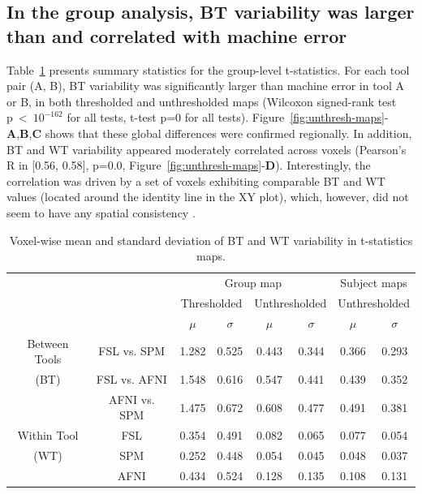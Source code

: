 \documentclass[11pt,onecolumn]{article}
\begin{document}
\subsection{In the group analysis, BT variability was larger than and correlated with machine error}

Table~\ref{table:pipeline-stats} presents summary statistics for the
group-level t-statistics. For each tool pair (A, B), BT variability was
significantly larger than machine error in tool A or B, in both thresholded
and unthresholded maps (Wilcoxon signed-rank test p~\textless~$10^{-162}$
for all tests, t-test p=0 for all tests).
Figure~\ref{fig:unthresh-maps}-\textbf{A},\textbf{B},\textbf{C} shows that
these global differences were confirmed regionally. 
In addition, BT and WT variability appeared moderately correlated across voxels (Pearson's R
in [0.56, 0.58], p=0.0, Figure~\ref{fig:unthresh-maps}-\textbf{D}). Interestingly, the correlation 
was driven by a set of voxels exhibiting comparable BT and
WT values (located around the identity line in the XY plot), which, however, did not seem to have 
any spatial consistency .


\setlength{\tabcolsep}{5pt}
\begin{table}[h]
    \centering
    \begin{tabular}{cccccc|cc}
        \toprule
        && \multicolumn{4}{c|}{Group map} & \multicolumn{2}{c}{Subject maps}\\
        \multirow{2}{*}{}& {} & \multicolumn{2}{c}{Thresholded} & \multicolumn{2}{c|}{Unthresholded} & \multicolumn{2}{c}{Unthresholded} \\
        {} & {} & $\mu$ & $\sigma$ & $\mu$ & $\sigma$ & $\mu$ & $\sigma$ \\
        \midrule
        \rowcolor{lightgray!50}
        {Between Tools} & FSL vs. SPM        &  1.282       & 0.525      & 0.443     & 0.344  & 0.366       & 0.293     \\
        \rowcolor{lightgray!50}
        {(BT)} & FSL vs. AFNI                &  1.548       & 0.616      & 0.547     & 0.441  & 0.439       & 0.352     \\
        \rowcolor{lightgray!50} 
        {} & AFNI vs. SPM                    &  1.475       & 0.672      & 0.608     & 0.477  & 0.491       & 0.381     \\
        {Within Tool} & FSL                  &  0.354       & 0.491      & 0.082     & 0.065  & 0.077       & 0.054     \\
        {(WT)}   & SPM                       &  0.252       & 0.448      & 0.054     & 0.045  & 0.048       & 0.037     \\
        {}   & AFNI                          &  0.434       & 0.524      & 0.128     & 0.135  & 0.108       & 0.131     \\
        \bottomrule
    \end{tabular}
    \caption{Voxel-wise mean and standard deviation of BT and WT variability
    in t-statistics maps. }
    \label{table:pipeline-stats}
\end{table}
\end{document}
